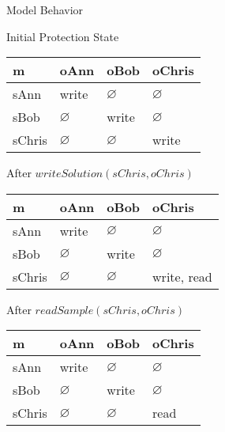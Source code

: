 \documentclass[a4paper]{article}
\begin{document}
\begin{multicols}{3}
    Model Behavior
    \begin{itemize*}
        \item Initial Protection State
              \begin{tabular}{l|l|l|l}
                  m      & oAnn          & oBob          & oChris        \\\hline
                  sAnn   & {write}       & $\varnothing$ & $\varnothing$ \\
                  sBob   & $\varnothing$ & {write}       & $\varnothing$ \\
                  sChris & $\varnothing$ & $\varnothing$ & {write}
              \end{tabular}
        \item After $writeSolution(sChris, oChris)$
              \begin{tabular}{l|l|l|l}
                  m      & oAnn          & oBob          & oChris        \\\hline
                  sAnn   & {write}       & $\varnothing$ & $\varnothing$ \\
                  sBob   & $\varnothing$ & {write}       & $\varnothing$ \\
                  sChris & $\varnothing$ & $\varnothing$ & {write, read}
              \end{tabular}
        \item After $readSample(sChris, oChris)$
              \begin{tabular}{l|l|l|l}
                  m      & oAnn          & oBob          & oChris        \\\hline
                  sAnn   & {write}       & $\varnothing$ & $\varnothing$ \\
                  sBob   & $\varnothing$ & {write}       & $\varnothing$ \\
                  sChris & $\varnothing$ & $\varnothing$ & {read}
              \end{tabular}
    \end{itemize*}


\end{multicols}
\end{document}
